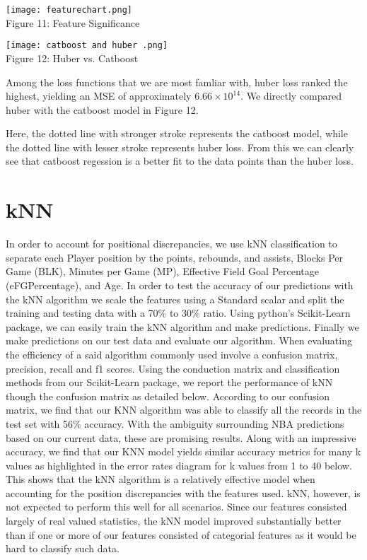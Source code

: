 \documentclass{article}
\begin{document}
\begin{minipage}[b]{0.6\textwidth}
    \texttt{[image: featurechart.png]}
    \\Figure 11: Feature Significance\\
  \end{minipage}
  \hfill
\begin{minipage}[b]{0.8\textwidth}
    \texttt{[image: catboost and huber .png]}
    \\Figure 12: Huber vs. Catboost\\
  \end{minipage}


Among the loss functions that we are most famliar with, huber loss ranked the highest, yielding an MSE of approximately $6.66\times10^{14}$. We directly compared huber with the catboost model in Figure 12. 

Here, the dotted line with stronger stroke represents the catboost model, while the dotted line with lesser stroke represents huber loss. From this we can clearly see that catboost regession is a better fit to the data points than the huber loss.


\section{kNN}

In order to account for positional discrepancies, we use kNN classification to separate each Player position by the points, rebounds, and assists, Blocks Per Game (BLK), Minutes per Game (MP), Effective Field Goal Percentage (eFGPercentage), and Age. In order to test the accuracy of our predictions with the kNN algorithm we scale the features using a Standard scalar and split the training and testing data with a 70$\%$ to 30$\%$ ratio. Using python's Scikit-Learn package, we can easily train the kNN algorithm and make predictions. Finally we make predictions on our test data and evaluate our algorithm. When evaluating the efficiency of a said algorithm commonly used involve a confusion matrix, precision, recall and f1 scores. Using the conduction matrix and classification methods from our Scikit-Learn package, we report the performance of kNN though the confusion matrix as detailed below.
According to our confusion matrix, we find that our KNN algorithm was able to classify all the records in the test set with 56$\%$ accuracy. With the ambiguity surrounding NBA predictions based on our current data, these are promising results. Along with an impressive accuracy, we find that our KNN model yields similar accuracy metrics for many k values as highlighted in the error rates diagram for k values from 1 to 40 below. This shows that the kNN algorithm is a relatively effective model when accounting for the position discrepancies with the features used. kNN, however, is not expected to perform this well for all scenarios. Since our features consisted largely of real valued statistics, the kNN model improved substantially better than if one or more of our features consisted of categorial features as it would be hard to classify such data.
\end{document}
